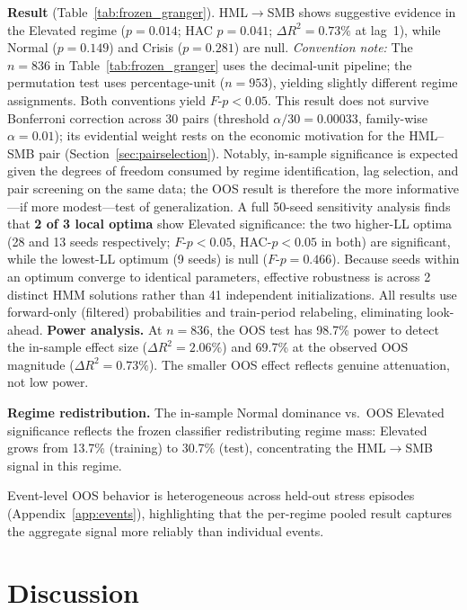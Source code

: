 \documentclass[sigconf,anonymous]{acmart}
\begin{document}
\textbf{Result} (Table~\ref{tab:frozen_granger}). HML$\to$SMB shows suggestive evidence in the Elevated regime
($p = 0.014$; HAC $p = 0.041$; $\Delta R^2 = 0.73\%$ at lag~1),
while Normal ($p = 0.149$) and Crisis ($p = 0.281$) are null.
\emph{Convention note:} The $n = 836$ in Table~\ref{tab:frozen_granger} uses the
decimal-unit pipeline; the permutation test uses percentage-unit ($n = 953$), yielding
slightly different regime assignments. Both conventions yield $F$-$p < 0.05$.
This result does not survive Bonferroni correction across 30 pairs
(threshold $\alpha/30 = 0.00033$, family-wise $\alpha = 0.01$); its evidential weight
rests on the economic motivation for the HML--SMB pair
(Section~\ref{sec:pairselection}).
Notably, in-sample significance is expected given the degrees of freedom consumed
by regime identification, lag selection, and pair screening on the same data;
the OOS result is therefore the more informative---if more modest---test of
generalization.
A full 50-seed sensitivity analysis finds that \textbf{2 of 3 local optima}
\label{tab:optima_oos}
show Elevated significance: the two higher-LL optima (28 and 13 seeds respectively;
$F$-$p < 0.05$, HAC-$p < 0.05$ in both) are significant, while the lowest-LL
optimum (9 seeds) is null ($F$-$p = 0.466$). Because seeds within an optimum
converge to identical parameters, effective robustness is across 2 distinct HMM
solutions rather than 41 independent initializations.
All results use forward-only (filtered) probabilities and train-period relabeling,
eliminating look-ahead.
\textbf{Power analysis.} At $n = 836$, the OOS test has 98.7\% power to detect
the in-sample effect size ($\Delta R^2 = 2.06\%$) and 69.7\% at the observed
OOS magnitude ($\Delta R^2 = 0.73\%$). The smaller OOS effect reflects genuine
attenuation, not low power.

\textbf{Regime redistribution.} The in-sample Normal dominance vs.\ OOS Elevated
significance reflects the frozen classifier redistributing regime mass:
Elevated grows from 13.7\% (training) to 30.7\% (test), concentrating the
HML$\to$SMB signal in this regime.

Event-level OOS behavior is heterogeneous across held-out stress episodes
(Appendix~\ref{app:events}), highlighting that the per-regime pooled result
captures the aggregate signal more reliably than individual events.

\section{Discussion}
\end{document}

